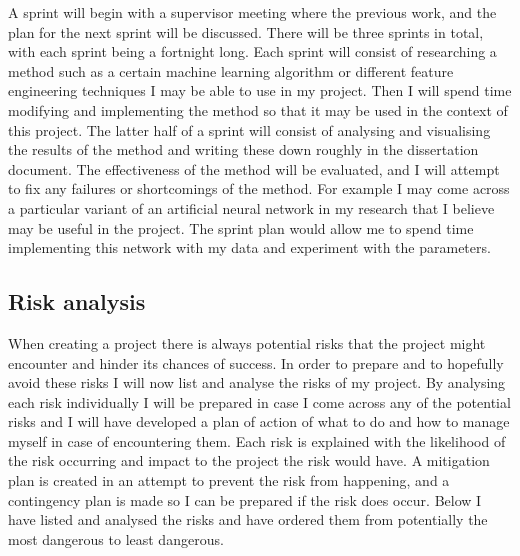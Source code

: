\documentclass{article}
\begin{document}
A sprint will begin with a supervisor meeting where the previous work, and the plan for the next sprint will be discussed.
There will be three sprints in total, with each sprint being a fortnight long.
Each sprint will consist of researching a method such as a certain machine learning algorithm or different feature engineering techniques I may be able to use in my project.
Then I will spend time modifying and implementing the method so that it may be used in the context of this project.
The latter half of a sprint will consist of analysing and visualising the results of the method and writing these down roughly in the dissertation document.
The effectiveness of the method will be evaluated, and I will attempt to fix any failures or shortcomings of the method.
For example I may come across a particular variant of an artificial neural network in my research that I believe may be useful in the project.
The sprint plan would allow me to spend time implementing this network with my data and experiment with the parameters.  




\subsection{Risk analysis}
When creating a project there is always potential risks that the project might encounter and hinder its chances of success. 
In order to prepare and to hopefully avoid these risks I will now list and analyse the risks of my project. 
By analysing each risk individually I will be prepared in case I come across any of the potential risks and I will have developed a plan of action of what to do and how to manage myself in case of encountering them. 
Each risk is explained with the likelihood of the risk occurring and impact to the project the risk would have.
A mitigation plan is created in an attempt to prevent the risk from happening, and a contingency plan is made so I can be prepared if the risk does occur.
Below I have listed and analysed the risks and have ordered them from potentially the most dangerous to least dangerous. 

\end{document}
